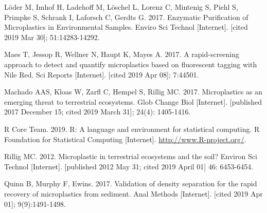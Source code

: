 \documentclass[]{article}
\begin{document}
Löder M, Imhof H, Ladehoff M, Löschel L, Lorenz C, Mintenig S, Piehl S,
Primpke S, Schrank I, Laforsch C, Gerdts G. 2017. Enzymatic Purification
of Microplastics in Environmental Samples. Enviro Sci Technol
{[}Internet{]}. {[}cited 2019 Mar 30{]}; 51:14283-14292.

Maes T, Jessop R, Wellner N, Haupt K, Mayes A. 2017. A rapid-screening
approach to detect and quantify microplastics based on fluorescent
tagging with Nile Red. Sci Reports {[}Internet{]}. {[}cited 2019 Apr
08{]}; 7:44501.

Machado AAS, Kloas W, Zarfl C, Hempel S, Rillig MC. 2017. Microplastics
as an emerging threat to terrestrial ecosystems. Glob Change Biol
{[}Internet{]}. {[}published 2017 December 15; cited 2019 March 31{]};
24(4): 1405-1416.

R Core Team. 2019. R: A language and environment for statistical
computing. R Foundation for Statistical Computing {[}Internet{]}.
\url{http://www.R-project.org/}.

Rillig MC. 2012. Microplastic in terrestrial ecosystems and the soil?
Environ Sci Technol {[}Internet{]}. {[}published 2012 May 31; cited 2019
April 01{]} 46: 6453-6454.

Quinn B, Murphy F, Ewins. 2017. Validation of density separation for the
rapid recovery of microplastics from sediment. Anal Methods
{[}Internet{]}. {[}cited 2019 Apr 01{]}; 9(9):1491-1498.
\end{document}
